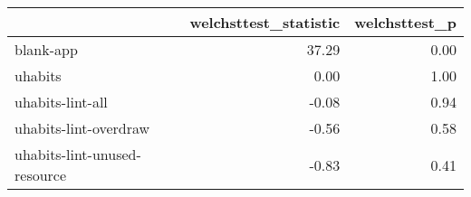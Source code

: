 \begin{tabular}{lrr}
\toprule
{} &  welchsttest\_statistic &  welchsttest\_p \\
\midrule
blank-app                    &                  37.29 &           0.00 \\
uhabits                      &                   0.00 &           1.00 \\
uhabits-lint-all             &                  -0.08 &           0.94 \\
uhabits-lint-overdraw        &                  -0.56 &           0.58 \\
uhabits-lint-unused-resource &                  -0.83 &           0.41 \\
\bottomrule
\end{tabular}
